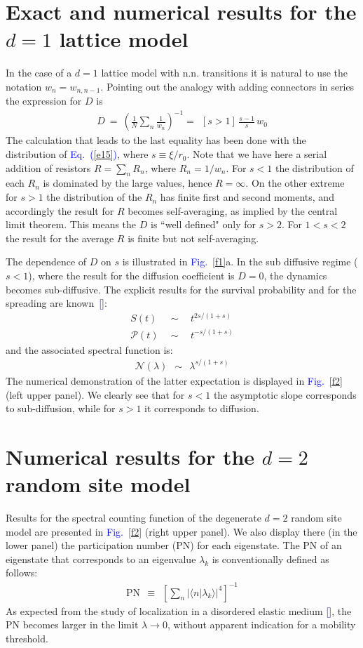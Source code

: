 \documentclass[aps,pre,floats,floatfix,twocolumn]{revtex4}
\newcommand{\beq}{\begin{eqnarray}}
\newcommand{\eeq}{\end{eqnarray}}
\newcommand{\Eq}[1]{\textcolor{blue}{Eq.\!\!~(\ref{#1})}}
\newcommand{\Fig}[1]{\textcolor{blue}{Fig.}\!\!~\ref{#1}}
\renewcommand{\cite}[1]{\textcolor{blue}{[\onlinecite{#1}}]} %
\begin{document}
\section{Exact and numerical results for the $d{=}1$ lattice model}
\label{onedim}

In the case of a $d{=}1$ lattice model with n.n. transitions 
it is natural to use the notation $w_n=w_{n,n{-}1}$. 
Pointing out the analogy with adding connectors in series 
the expression for $D$ is 
%
\beq
D \ = \ \left( \frac{1}{N} \sum_n \frac{1}{w_n} \right)^{-1} 
= \ \ [s>1] \, \frac{s-1}{s} \, w_0
\eeq
%
The calculation that leads to the last equality 
has been done with the distribution of \Eq{e15}, 
where ${s \equiv \xi/r_0}$.  Note that we have 
here a serial addition of resistors $R=\sum_n R_n$, 
where ${R_n=1/w_n}$.  For ${s<1}$ the distribution 
of each $R_n$ is dominated by the large values, 
hence ${R=\infty}$. On the other extreme for ${s>1}$ 
the distribution of the $R_n$ has finite first and second moments,  
and accordingly the result for $R$ becomes self-averaging, 
as implied by the central limit theorem.
This means the $D$ is ``well defined" only for ${s>2}$. 
For ${1<s<2}$ the result for the average $R$ is finite 
but not self-averaging.


The dependence of $D$ on $s$ is illustrated in \Fig{f1}a.
In the sub diffusive regime (${s<1}$),  
where the result for the diffusion coefficient is ${D=0}$, 
the dynamics becomes sub-diffusive.  
The explicit results for the survival probability 
and for the spreading are known~\cite{alexander}: 
%
\beq
S(t) \ \ &\sim& \ \ t^{2s/(1+s)}   \\ 
\mathcal{P}(t) \ \ &\sim& \ \ t^{-s/(1+s)}
\eeq
%
and the associated spectral function is:
%
\beq
\mathcal{N}(\lambda) \ \ \sim \ \ \lambda^{s/(1+s)}
\eeq
%
The numerical demonstration of the latter expectation is displayed 
in \Fig{f2} (left upper panel).
We clearly see that for $s<1$ the asymptotic slope corresponds 
to sub-diffusion, while for ${s>1}$ it corresponds to diffusion. 



\section{Numerical results for the $d{=}2$ random site model}

Results for the spectral counting function
of the degenerate $d{=}2$ random site model are presented  
in \Fig{f2} (right upper panel). 
We also display there (in the lower panel) 
the participation number (PN) for each eigenstate. 
The PN of an eigenstate that corresponds to 
an eigenvalue $\lambda_k$ is conventionally 
defined as follows:
%
\beq 
\text{PN} \ \ \equiv \ \ \left[ \sum_n |\langle n| \lambda_k \rangle|^4 \right]^{-1}
\eeq
%
As expected from the study of localization
in a disordered elastic medium \cite{loc}, 
the PN becomes larger in the limit ${\lambda\rightarrow 0}$, 
without apparent indication for a mobility threshold.
\end{document}
